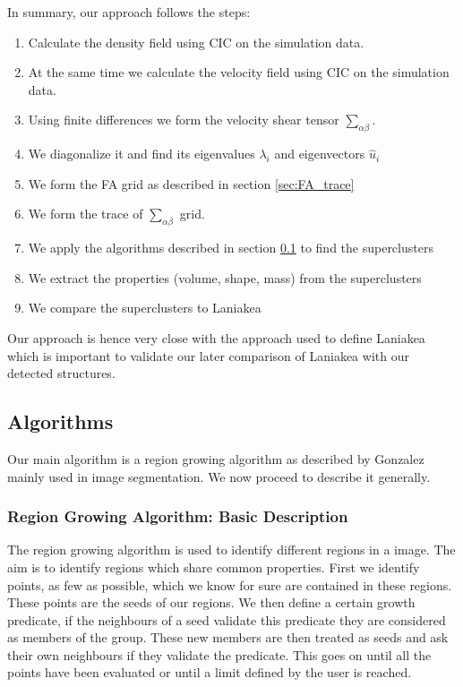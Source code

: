 \documentclass[12pt]{article}
\begin{document}
\begin{par}
In summary, our approach follows the steps:
\end{par}

\begin{enumerate}
\item Calculate the density field using CIC on the simulation data.
\item At the same time we calculate the velocity field using CIC on the simulation data.
\item Using finite differences we form the velocity shear tensor $\sum_{\alpha \beta}$.
\item We diagonalize it and find its eigenvalues $\lambda_i$ and eigenvectors $\hat{u}_i$
\item We form the FA grid as described in section \ref{sec:FA_trace} 
\item We form the trace of $\sum_{\alpha \beta}$ grid.
\item We apply the algorithms described in section \ref{sec:algorithms} to find the superclusters
\item We extract the properties (volume, shape, mass) from the superclusters
\item We compare the superclusters to Laniakea
\end{enumerate}




\begin{par}
Our approach is hence very close with the approach
 used to define Laniakea
  \cite{tully_laniakea_2014} which is important to
   validate our later comparison of Laniakea with
    our detected structures.
\end{par}

\subsection{Algorithms}\label{sec:algorithms}

Our main algorithm is a region growing algorithm
 as described by Gonzalez
  \cite{gonzalez_digital_2008} mainly used in
   image segmentation. We now proceed to describe
    it generally.
\subsubsection{Region Growing Algorithm: Basic Description}

\begin{par}
The region growing algorithm is used to identify different regions in a image. The aim is to identify regions which share common properties. First we identify points, as few as possible, which we know for sure are contained in these regions. These points are the seeds of our regions. We then define a certain growth predicate, if the neighbours of a seed validate this predicate they are considered as members of the group. These new members are then treated as seeds and ask their own neighbours if they validate the predicate. This goes on until all the points have been evaluated or until a limit defined by the user is reached.
\end{par}
\end{document}
